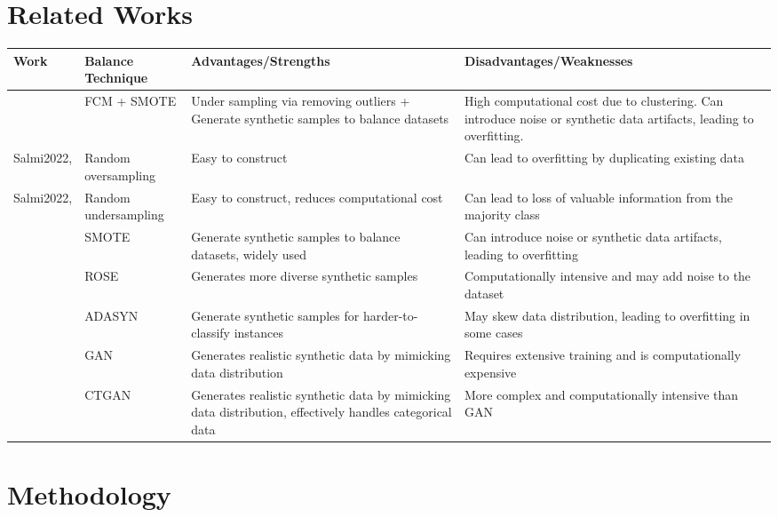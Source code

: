 \documentclass[twoside,11pt]{article}
\begin{document}
\section{Related Works}\label{sec:relatedwork}
\begin{longtable}{|p{1.5cm}|p{2cm}|p{5cm}|p{5cm}|}
\hline
\textbf{Work} & \textbf{Balance Technique} & \textbf{Advantages/Strengths} & \textbf{Disadvantages/Weaknesses} \\
\hline
\citealp{Patel2019} & FCM + SMOTE & Under sampling via removing outliers + Generate synthetic samples to balance datasets & High computational cost due to clustering. Can introduce noise or synthetic data artifacts, leading to overfitting. \\
\hline
Salmi2022,\citealp{Patel2019} & Random oversampling & Easy to construct & Can lead to overfitting by duplicating existing data \\
\hline
Salmi2022,\citealp{Patel2019} & Random undersampling & Easy to construct, reduces computational cost & Can lead to loss of valuable information from the majority class \\
\hline
\citealp{Patel2019,Harjai2019,Salmi2022,Wongpanti2024} & SMOTE & Generate synthetic samples to balance datasets, widely used & Can introduce noise or synthetic data artifacts, leading to overfitting \\
\hline
\citealp{Salmi2022} & ROSE & Generates more diverse synthetic samples & Computationally intensive and may add noise to the dataset \\
\hline
\citealp{Wongpanti2024} & ADASYN & Generate synthetic samples for harder-to-classify instances & May skew data distribution, leading to overfitting in some cases \\
\hline
\citealp{Wongpanti2024} & GAN & Generates realistic synthetic data by mimicking data distribution & Requires extensive training and is computationally expensive \\
\hline
\citealp{Wongpanti2024} & CTGAN & Generates realistic synthetic data by mimicking data distribution, effectively handles categorical data & More complex and computationally intensive than GAN \\
\hline
\end{longtable}

\section{Methodology} \label{sec:method}
\end{document}

